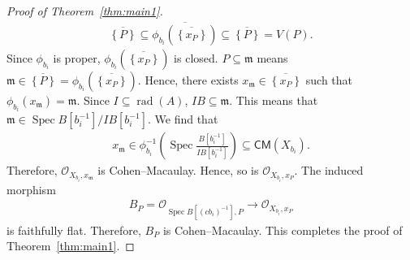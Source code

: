 \documentclass[a4paper, 11pt]{amsart}
\theoremstyle{definition}
\newcommand{\Spec}{\operatorname{Spec}}
\newcommand{\rad}{\operatorname{rad}}
\let\subset\subseteq
\begin{document}
\begin{proof}[Proof of Theorem~\ref{thm:main1}]
    \begin{align*}
        \overline{\left\{ P \right\}} \subset \overline{\phi_{b_i}(\overline{\left\{x_P \right\}})} \subset \overline{\left\{ P \right\}} = V(P).
    \end{align*}
    Since $\phi_{b_i}$ is proper, $\phi_{b_i}(\overline{\left\{ x_P \right\}})$ is closed. $P \subset \mathfrak{m}$ means $\mathfrak{m} \in \overline{\left\{ P \right\}} = \phi_{b_i}(\overline{\left\{ x_P \right\}})$. Hence, there exists $x_\mathfrak{m} \in \overline{\left\{ x_P \right\}}$ such that $\phi_{b_i}(x_\mathfrak{m}) = \mathfrak{m}$. Since $I \subset \rad(A)$, $IB \subset \mathfrak{m}$. This means that $\mathfrak{m} \in \Spec B[b_i^{-1}]/IB[b_i^{-1}]$. We find that 
    \begin{align*}
        x_\mathfrak{m} \in \phi_{b_i}^{-1}\left( \Spec \frac{B[b_i^{-1}]}{IB[b_i^{-1}]} \right) \subset \mathsf{CM}(X_{b_i}).
    \end{align*}
    Therefore, $\mathcal{O}_{X_{b_i}, x_\mathfrak{m}}$ is Cohen--Macaulay. Hence, so is $\mathcal{O}_{X_{b_i}, x_P}$. The induced morphism
    \begin{align*}
        B_P = \mathcal{O}_{\Spec B[(cb_i)^{-1}], P} \to \mathcal{O}_{X_{b_i}, x_P}
    \end{align*}
    is faithfully flat. Therefore, $B_P$ is Cohen--Macaulay. This completes the proof of Theorem~\ref{thm:main1}.
\end{proof}




\end{document}
